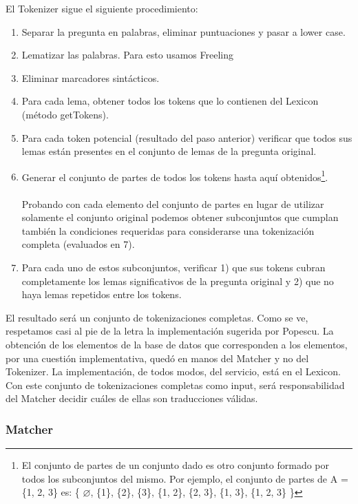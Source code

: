 \medskip

El Tokenizer sigue el siguiente procedimiento:
\begin{enumerate}
\item Separar la pregunta en palabras, eliminar puntuaciones y pasar a lower case.
\item Lematizar las palabras. Para esto usamos Freeling
\item Eliminar marcadores sintácticos.
\item Para cada lema, obtener todos los tokens que lo contienen del Lexicon (método getTokens).
\item Para cada token potencial (resultado del paso anterior) verificar que todos sus lemas están presentes en el conjunto de lemas de la pregunta original.
\item Generar el conjunto de partes de todos los tokens hasta aquí obtenidos\footnote{El conjunto de partes de un conjunto dado es otro conjunto formado por todos los subconjuntos del mismo. Por ejemplo, el conjunto de partes de A = \{1, 2, 3\} es: \{ $\varnothing$, \{1\}, \{2\}, \{3\}, \{1, 2\}, \{2, 3\}, \{1, 3\}, \{1, 2, 3\} \}}. \\ \\
	Probando con cada elemento del conjunto de partes en lugar de utilizar solamente el conjunto original podemos obtener subconjuntos que cumplan también la condiciones requeridas para considerarse una tokenización completa (evaluados en 7).
\item Para cada uno de estos subconjuntos, verificar 1) que sus tokens cubran completamente los lemas significativos de la pregunta original y 2) que no haya lemas repetidos entre los tokens.
\end{enumerate}

El resultado será un conjunto de tokenizaciones completas. Como se ve, respetamos casi al pie de la letra la implementación sugerida por Popescu. La obtención de los elementos de la base de datos que corresponden a los elementos, por una cuestión implementativa, quedó en manos del Matcher y no del Tokenizer. La implementación, de todos modos, del servicio, está en el Lexicon. Con este conjunto de tokenizaciones completas como input, será responsabilidad del Matcher decidir cuáles de ellas son traducciones válidas.

\subsubsection*{Matcher}
\label{subsubsec:matcher}


